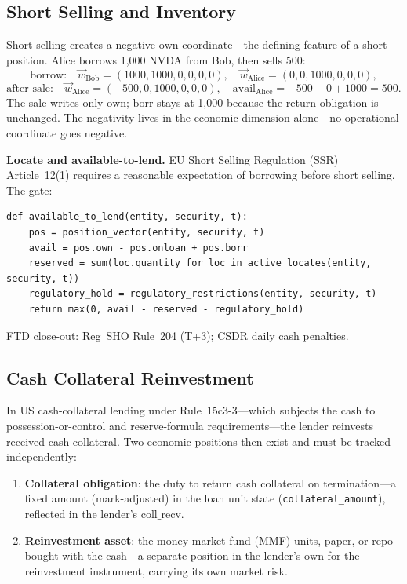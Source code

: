 \documentclass[11pt,a4paper]{article}
\begin{document}
\subsection{Short Selling and Inventory}
\label{sec:sbl-short-selling}

Short selling creates a negative $\mathrm{own}$ coordinate---the defining feature of a short position. Alice borrows 1{,}000 NVDA from Bob, then sells 500:
\[
\text{borrow:}\quad \vec{w}_{\mathrm{Bob}} = (1000,1000,0,0,0,0),\quad \vec{w}_{\mathrm{Alice}} = (0,0,1000,0,0,0),
\]
\[
\text{after sale:}\quad \vec{w}_{\mathrm{Alice}} = (-500,0,1000,0,0,0),\quad \mathrm{avail}_{\mathrm{Alice}} = -500-0+1000 = 500.
\]
The sale writes only $\mathrm{own}$; $\mathrm{borr}$ stays at 1{,}000 because the return obligation is unchanged. The negativity lives in the economic dimension alone---no operational coordinate goes negative.

\noindent\textbf{Locate and available-to-lend.} EU Short Selling Regulation (SSR) Article~12(1) requires a reasonable expectation of borrowing before short selling. The gate:
\begin{lstlisting}
def available_to_lend(entity, security, t):
    pos = position_vector(entity, security, t)
    avail = pos.own - pos.onloan + pos.borr
    reserved = sum(loc.quantity for loc in active_locates(entity, security, t))
    regulatory_hold = regulatory_restrictions(entity, security, t)
    return max(0, avail - reserved - regulatory_hold)
\end{lstlisting}
FTD close-out: Reg~SHO Rule~204 (T+3); CSDR daily cash penalties.

\subsection{Cash Collateral Reinvestment}
\label{sec:sbl-reinvestment}

In US cash-collateral lending under Rule~15c3-3---which subjects the cash to possession-or-control and reserve-formula requirements---the lender reinvests received cash collateral. Two economic positions then exist and must be tracked independently:

\begin{enumerate}[nosep]
\item \textbf{Collateral obligation}: the duty to return cash collateral on termination---a fixed amount (mark-adjusted) in the loan unit state (\texttt{collateral\_amount}), reflected in the lender's $\mathrm{coll\_recv}$.
\item \textbf{Reinvestment asset}: the money-market fund (MMF) units, paper, or repo bought with the cash---a separate position in the lender's $\mathrm{own}$ for the reinvestment instrument, carrying its own market risk.
\end{enumerate}
\end{document}
